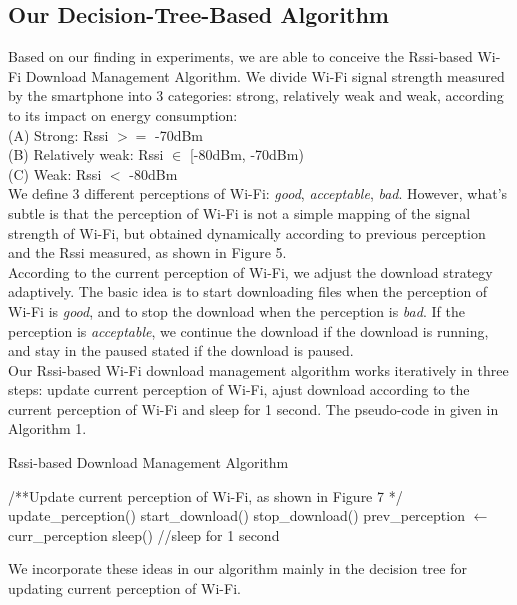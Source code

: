 \documentclass[journal]{IEEEtran}
\begin{document}
\subsection{Our Decision-Tree-Based Algorithm}
Based on our finding in experiments, we are able to conceive the Rssi-based Wi-Fi Download Management Algorithm. 
We divide Wi-Fi signal strength measured by the smartphone into 3 categories: strong, relatively weak and weak, 
according to its impact on energy consumption:
\\
\indent 
(A) Strong:           Rssi $>=$ -70dBm
\\
\indent 
(B) Relatively weak:  Rssi $\in$ [-80dBm, -70dBm)
\\
\indent 
(C) Weak: 	      Rssi $<$ -80dBm
\\
\indent 
We define 3 different perceptions of Wi-Fi: \textit{good}, \textit{acceptable}, \textit{bad}. However,
what's subtle is that the perception of Wi-Fi is not a simple mapping
of the signal strength of Wi-Fi, but obtained dynamically according to previous perception and the Rssi measured, as shown in Figure 5.
\\
\indent
According to the current perception of Wi-Fi, we adjust the download strategy adaptively. The basic idea 
is to start downloading files when the perception of Wi-Fi is \textit{good}, and to stop the download when the perception is \textit{bad}. If the perception 
is \textit{acceptable}, we continue the download if the download is running, and stay in the paused stated if the download is paused.
\\
\indent 
Our Rssi-based Wi-Fi download management algorithm works iteratively in three steps: update current perception of Wi-Fi, 
ajust download according to the current perception of Wi-Fi and sleep for 1 second. The pseudo-code in given in Algorithm 1.
\begin{algorithm}
\caption{Rssi-based Download Management Algorithm}\label{all}
\begin{algorithmic}[1]
\State /**Update current perception of Wi-Fi,  
\State  *as shown in Figure 7 */
\State update\_perception()
\State start\_download()
\State stop\_download()
\EndIf
\State prev\_perception $\gets$ curr\_perception
\State sleep() //sleep for 1 second
\EndWhile
\end{algorithmic}
\end{algorithm}
We incorporate these ideas in our algorithm mainly in the decision tree for updating current perception of Wi-Fi. 
\end{document}

